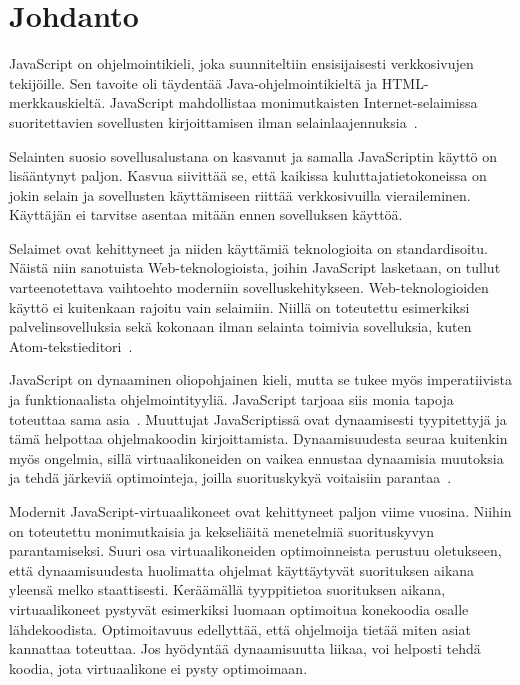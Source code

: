 \section{Johdanto}

JavaScript on ohjelmointikieli, joka suunniteltiin ensisijaisesti verkkosivujen tekijöille. Sen tavoite oli täydentää Java-ohjelmointikieltä ja HTML-merkkauskieltä. JavaScript mahdollistaa monimutkaisten Internet-selaimissa suoritettavien sovellusten kirjoittamisen ilman selainlaajennuksia~\cite{paolini1994netscape}.

Selainten suosio sovellusalustana on kasvanut ja samalla JavaScriptin käyttö on lisääntynyt paljon. Kasvua siivittää se, että kaikissa kuluttajatietokoneissa on jokin selain ja sovellusten käyttämiseen riittää verkkosivuilla vieraileminen. Käyttäjän ei tarvitse asentaa mitään ennen sovelluksen käyttöä.

Selaimet ovat kehittyneet ja niiden käyttämiä teknologioita on standardisoitu. Näistä niin sanotuista Web-teknologioista, joihin JavaScript lasketaan, on tullut varteenotettava vaihtoehto moderniin sovelluskehitykseen. Web-teknologioiden käyttö ei kuitenkaan rajoitu vain selaimiin. Niillä on toteutettu esimerkiksi palvelinsovelluksia sekä kokonaan ilman selainta toimivia sovelluksia, kuten Atom-tekstieditori~\cite{atom}.

JavaScript on dynaaminen oliopohjainen kieli, mutta se tukee myös imperatiivista ja funktionaalista ohjelmointityyliä. JavaScript tarjoaa siis monia tapoja toteuttaa sama asia~\cite[4.2.1.]{es6}. Muuttujat JavaScriptissä ovat dynaamisesti tyypitettyjä ja tämä helpottaa ohjelmakoodin kirjoittamista. Dynaamisuudesta seuraa kuitenkin myös ongelmia, sillä virtuaalikoneiden on vaikea ennustaa dynaamisia muutoksia ja tehdä järkeviä optimointeja, joilla suorituskykyä voitaisiin parantaa~\cite[s.~497]{Ahn2014}.

Modernit JavaScript-virtuaalikoneet ovat kehittyneet paljon viime vuosina. Niihin on toteutettu monimutkaisia ja kekseliäitä menetelmiä suorituskyvyn parantamiseksi. Suuri osa virtuaalikoneiden optimoinneista perustuu oletukseen, että dynaamisuudesta huolimatta ohjelmat käyttäytyvät suorituksen aikana yleensä melko staattisesti. Keräämällä tyyppitietoa suorituksen aikana, virtuaalikoneet pystyvät esimerkiksi luomaan optimoitua konekoodia osalle lähdekoodista. Optimoitavuus edellyttää, että ohjelmoija tietää miten asiat kannattaa toteuttaa. Jos hyödyntää dynaamisuutta liikaa, voi helposti tehdä koodia, jota virtuaalikone ei pysty optimoimaan.

